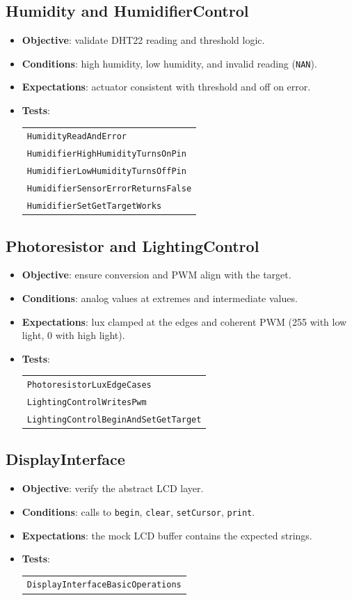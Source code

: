 \subsection{Humidity and HumidifierControl}
\begin{itemize}
  \item \textbf{Objective}: validate DHT22 reading and threshold logic.
  \item \textbf{Conditions}: high humidity, low humidity, and invalid reading (\texttt{NAN}).
  \item \textbf{Expectations}: actuator consistent with threshold and off on error.
  \item \textbf{Tests}:
  \begin{tabular}[t]{@{}l@{}}
    \texttt{HumidityReadAndError}\\
    \texttt{HumidifierHighHumidityTurnsOnPin}\\
    \texttt{HumidifierLowHumidityTurnsOffPin}\\
    \texttt{HumidifierSensorErrorReturnsFalse}\\
    \texttt{HumidifierSetGetTargetWorks}
  \end{tabular}
\end{itemize}

\subsection{Photoresistor and LightingControl}
\begin{itemize}
  \item \textbf{Objective}: ensure conversion and PWM align with the target.
  \item \textbf{Conditions}: analog values at extremes and intermediate values.
  \item \textbf{Expectations}: lux clamped at the edges and coherent PWM (255 with low light, 0 with high light).
  \item \textbf{Tests}:
  \begin{tabular}[t]{@{}l@{}}
    \texttt{PhotoresistorLuxEdgeCases}\\
    \texttt{LightingControlWritesPwm}\\
    \texttt{LightingControlBeginAndSetGetTarget}
  \end{tabular}
\end{itemize}

\subsection{DisplayInterface}
\begin{itemize}
  \item \textbf{Objective}: verify the abstract LCD layer.
  \item \textbf{Conditions}: calls to \texttt{begin}, \texttt{clear}, \texttt{setCursor}, \texttt{print}.
  \item \textbf{Expectations}: the mock LCD buffer contains the expected strings.
  \item \textbf{Tests}:
  \begin{tabular}[t]{@{}l@{}}
    \texttt{DisplayInterfaceBasicOperations}
  \end{tabular}
\end{itemize}

